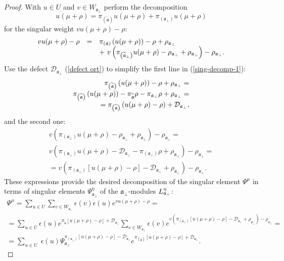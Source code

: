 \documentclass[12pt]{article}
\theoremstyle{definition}
\newcommand{\af}{\mathfrak{a}}
\newcommand{\aft}{\widetilde{\mathfrak{a}}}
\newcommand{\afb}{\mathfrak{a}_{\bot}}
\begin{document}
\begin{proof}
With $u\in U$ and $v\in W_{\af_{\bot }}$ perform the decomposition
\[
u(\mu +\rho )=\pi _{\left( \aft\right) }u(\mu +\rho )+\pi _{\left(
\afb\right) }u(\mu +\rho )
\]
for the singular weight $vu(\mu +\rho )-\rho $:
\begin{equation}
\begin{array}{lcl}
vu(\mu +\rho )-\rho  & = & \pi _{\left( \af\right) }\left( u(\mu +\rho
)\right) -\rho +\rho _{\afb}
\\
&  & +\ v\left( \pi _{\left( \aft_{\perp }\right) }u(\mu
+\rho )-\rho _{\afb}+\rho _{\afb}\right) -\rho _{%
\afb} .
\end{array}
\label{sing-decomp-1}
\end{equation}
Use the defect $\mathcal{D}_{\af_{\bot }}$ (\ref{defect ort}) to
simplify the first line in (\ref{sing-decomp-1}):
\[
\begin{array}{r}
\pi _{\left( \aft\right) }\left( u(\mu +\rho )\right) -\rho +\rho _{%
\afb}= \\
\pi _{\left( \aft\right) }\left( u(\mu +\rho )\right) -\pi _{\aft%
}\rho -\pi _{\af_{\bot }}\rho +\rho _{\af_{\bot }}= \\
=\pi _{\left( \aft\right) }\left( u(\mu +\rho )-\rho \right) +\mathcal{D}%
_{\af_{\bot }},
\end{array}
\]
and the second one:
\[
\begin{array}{c}
v\left( \pi _{\left( \afb\right) }u(\mu +\rho
)-\rho _{\afb}+\rho _{\afb}\right) -\rho _{\af%
_{\perp }}= \\
v\left( \pi _{\left( \af_{\bot }\right) }u(\mu +\rho )-%
\mathcal{D}_{\af_{\bot }}-\pi _{\left( \af_{\bot }\right) }\rho
+\rho _{\af_{\bot }}\right)
-\rho _{\af_{\bot }}= \\
=v\left( \pi _{\left( \af_{\bot }\right) }\left[ u(\mu
+\rho )-\rho \right] -\mathcal{D}_{\af_{\bot }}+\rho _{\af_{\bot
}}\right) -\rho _{\af_{\bot }}.
\end{array}
\]
These expressions provide the desired decomposition of the singular element $%
\Psi ^{\mu }$ in terms of singular elements $\Psi _{\af%
_{\perp }}^{\eta }$ of the $\afb$-modules $L_{%
\afb}^{\eta }$:
\begin{equation}
\begin{array}{l}
\Psi ^{\mu }=\sum_{u\in U}\sum_{v\in W_{\afb}}\epsilon
(v)\epsilon (u)e^{vu(\mu +\rho )-\rho }= \\
=\sum_{u\in U}\epsilon (u)e^{\pi _{\aft}\left[ u(\mu +\rho )-\rho \right]
+\mathcal{D}_{\afb}}\sum_{v\in W_{\afb}}\epsilon
(v)e^{v\left( \pi _{\left( \afb\right) }\left[
u(\mu +\rho )-\rho \right] -\mathcal{D}_{\afb}+\rho _{\af%
_{\perp }}\right) -\rho _{\afb}}= \\
=\sum_{u\in U}\;\epsilon (u)\Psi _{\afb}^{\pi
_{\left( \afb\right) }\left[ u(\mu +\rho )-\rho
\right] -\mathcal{D}_{\afb}}e^{\pi _{\left( \aft\right) }%
\left[ u(\mu +\rho )-\rho \right] +\mathcal{D}_{\afb}}.
\end{array}
\label{singular main}
\end{equation}
\end{proof}
\end{document}
